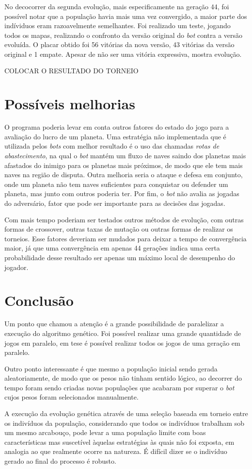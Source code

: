 \documentclass[a4paper,titlepage,11pt]{article}
\begin{document}
No decocorrer da segunda evolução, mais especificamente na geração 44, foi possível notar que a população havia mais uma vez convergido, a maior parte dos indíviduos eram razoavelmente semelhantes. Foi realizado um teste, jogando todos os mapas, realizando o confronto da versão original do {\em bot} contra a versão evoluída. O placar obtido foi 56 vitórias da nova versão, 43 vitórias da versão original e 1 empate. Apesar de não ser uma vitória expressiva, mostra evolução.

COLOCAR O RESULTADO DO TORNEIO

\section{Possíveis melhorias}
O programa poderia levar em conta outros fatores do estado do jogo para a avaliação do lucro de um planeta. Uma estratégia não implementada que é utilizada pelos {\em bots} com melhor resultado é o uso das chamadas {\em rotas de abastecimento}, na qual o {\em bot} mantém um fluxo de naves saindo dos planetas mais afastados do inimigo para os planetas mais próximos, de modo que ele tem mais naves na região de disputa. Outra melhoria seria o ataque e defesa em conjunto, onde um planeta não tem naves suficientes para conquistar ou defender um planeta, mas junto com outros poderia ter. Por fim, o {\em bot} não avalia as jogadas do adversário, fator que pode ser importante para as decisões das jogadas.

Com mais tempo poderiam ser testados outros métodos de evolução, com outras formas de crossover, outras taxas de mutação ou outras formas de realizar os torneios. Esse fatores deveriam ser mudados para deixar a tempo de convergência maior, já que uma convergência em apenas 44 gerações indica uma certa probabilidade desse resultado ser apenas um máximo local de desempenho do jogador.

\section{Conclusão}
Um ponto que chamou a atenção é a grande possibilidade de paralelizar a execução do algoritmo genético. Foi possível realizar uma grande quantidade de jogos em paralelo, em tese é possível realizar todos os jogos de uma geração em paralelo. 

Outro ponto interessante é que mesmo a população inicial sendo gerada aleatoriamente, de modo que os pesos não tinham sentido lógico, ao decorrer do tempo foram sendo criadas novas populações que acabaram por superar o {\em bot} cujos pesos foram selecionados manualmente.

A execução da evolução genética através de uma seleção baseada em torneio entre os indivíduos da população, considerando que todos os indivíduos trabalham sob um mesmo arcabouço, pode levar a uma população limite com boas características mas suscetível àquelas estratégias às quais não foi exposta, em analogia ao que realmente ocorre na natureza. É difícil dizer se o indivíduo gerado ao final do processo é robusto.
\end{document}
